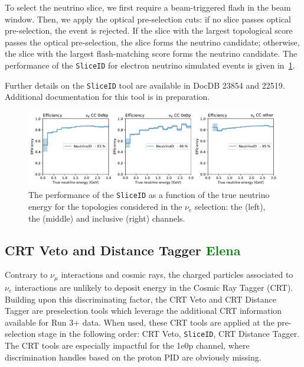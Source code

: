 To select the neutrino slice, we first require a beam-triggered flash in the beam window. 
Then, we apply the optical pre-selection cuts: if no slice passes optical pre-selection, the event is rejected. 
If the slice with the largest topological score passes the optical pre-selection, the slice forms the neutrino candidate; otherwise, the slice with the largest flash-matching score forms the neutrino candidate.
The performance of the \texttt{SliceID} for electron neutrino simulated events is given in~\cref{fig:sliceid}.

Further details on the \texttt{SliceID} tool are available in DocDB 23854 and 22519. Additional documentation for this tool is in preparation.



\begin{figure}[H]
    \centering
    \includegraphics[width=\textwidth]{NuId-Ch2/Images/efficiency_cat_0.pdf}
    \caption{The performance of the \texttt{SliceID} as a function of the true neutrino energy for the topologies considered in the $\nu_e$ selection: the \npsel (left), the  \zpsel (middle) and inclusive (right) channels.}
    \label{fig:sliceid}
\end{figure}



\subsection{CRT Veto and Distance Tagger \textcolor{green}{Elena}}
\label{sec:sliceID:CRT}
Contrary to  $\nu_\mu$ interactions and cosmic rays, the charged particles associated to $\nu_e$ interactions are unlikely to deposit energy in the Cosmic Ray Tagger (CRT). Building upon this discriminating factor, the CRT Veto and CRT Distance Tagger are preselection tools which leverage the additional CRT information available for Run 3+ data.
When used, these CRT tools are applied at the pre-selection stage in the following order: CRT Veto, \texttt{SliceID}, CRT Distance Tagger. The CRT tools are especially impactful for the 1e0p channel, where discrimination handles based on the proton PID are obviously missing. \\


